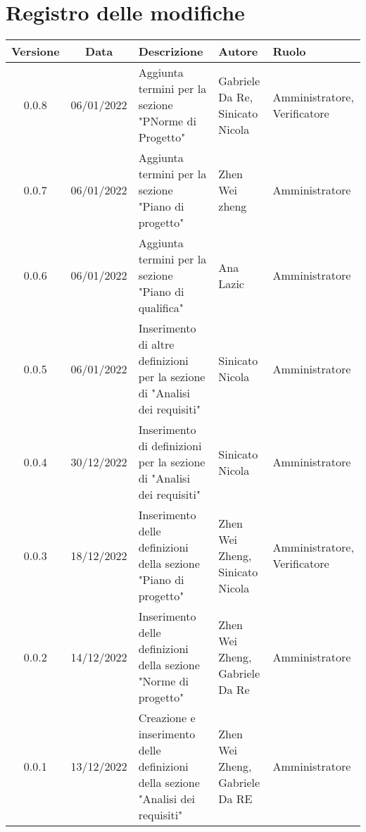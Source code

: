 \section*{Registro delle modifiche}
\begin{center}
\renewcommand\tabularxcolumn[1]{>{\Centering}m{#1}}
\begin{tabularx}{\textwidth}{| c | c | X | X | X |} 
\hline
 \textbf{Versione} & \textbf{Data} & \textbf{Descrizione} & \textbf{Autore} & \textbf{Ruolo}\\
 \hline
 0.0.8 & 06/01/2022 & Aggiunta termini per la sezione "PNorme di Progetto" & Gabriele Da Re, Sinicato Nicola & Amministratore, Verificatore \\
 \hline
 0.0.7 & 06/01/2022 & Aggiunta termini per la sezione "Piano di progetto" & Zhen Wei zheng & Amministratore \\
 \hline
 0.0.6 & 06/01/2022 & Aggiunta termini per la sezione "Piano di qualifica" & Ana Lazic & Amministratore \\
 \hline
 0.0.5 & 06/01/2022 & Inserimento di altre definizioni per la sezione di "Analisi dei requisiti" & Sinicato Nicola & Amministratore \\
 \hline
 0.0.4 & 30/12/2022 & Inserimento di definizioni per la sezione di "Analisi dei requisiti" & Sinicato Nicola & Amministratore \\
 \hline
 0.0.3 & 18/12/2022 & Inserimento delle definizioni della sezione "Piano di progetto" & Zhen Wei Zheng, Sinicato Nicola & Amministratore, Verificatore\\
 \hline
 0.0.2 & 14/12/2022 & Inserimento delle definizioni della sezione "Norme di progetto" & Zhen Wei Zheng, Gabriele Da Re & Amministratore\\
 \hline
 0.0.1 & 13/12/2022 & Creazione e inserimento delle definizioni della sezione "Analisi dei requisiti" & Zhen Wei Zheng, Gabriele Da RE & Amministratore\\
 \hline
\end{tabularx}
\end{center}
